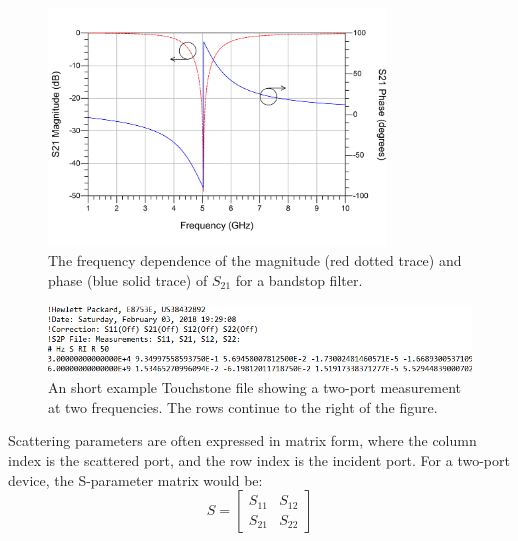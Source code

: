 \documentclass[../thesis/thesis.tex]{subfiles}
\begin{document}
\begin{figure}
	\centering
	\includegraphics[width=0.8\textwidth]{ch2_filter}
	\caption[The frequency dependence of a bandstop filter.]{The frequency dependence of the magnitude (red dotted trace) and phase (blue solid trace) of $S_{21}$ for a bandstop filter.}
	\label{ch2_fig_filter}
\end{figure}

\begin{figure}
	\centering
	\includegraphics[width=\textwidth]{ch2_s2p}
	\caption[The Touchstone file layout.]{An short example Touchstone file showing a two-port measurement at two frequencies. The rows continue to the right of the figure.}
	\label{ch2_fig_s2p}
\end{figure}

Scattering parameters are often expressed in matrix form, where the column index is the scattered port, and the row index is the incident port. For a two-port device, the S-parameter matrix would be:
\begin{equation}
S=
\begin{bmatrix}
S_{11} & S_{12} \\
S_{21} & S_{22}
\end{bmatrix}
\end{equation}
\end{document}
